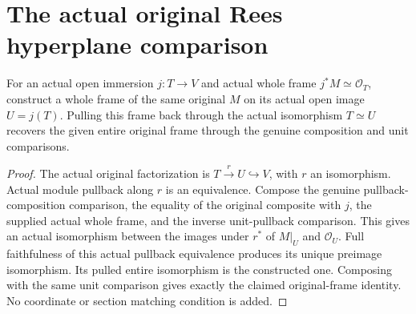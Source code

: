 \section{The actual original Rees hyperplane comparison}

\begin{lemma}
\leanok
\label{lem:kn-nadel-nef-big-open-image-frame}
For an actual open immersion $j:T\to V$ and actual whole frame
$j^*M\simeq\mathcal O_T$, construct a whole frame of the same original
$M$ on its actual open image $U=j(T)$. Pulling this frame back through
the actual isomorphism $T\simeq U$ recovers the given entire original
frame through the genuine composition and unit comparisons.
\end{lemma}
\begin{proof}
The actual original factorization is $T\xrightarrow{r}U\hookrightarrow V$,
with $r$ an isomorphism. Actual module pullback along $r$ is an equivalence.
Compose the genuine pullback-composition comparison, the equality of the
original composite with $j$, the supplied actual whole frame, and the
inverse unit-pullback comparison. This gives an actual isomorphism between
the images under $r^*$ of $M|_U$ and $\mathcal O_U$. Full faithfulness of
this actual pullback equivalence produces its unique preimage isomorphism.
Its pulled entire isomorphism is the constructed one. Composing with the
same unit comparison gives exactly the claimed original-frame identity.
No coordinate or section matching condition is added.
\end{proof}

